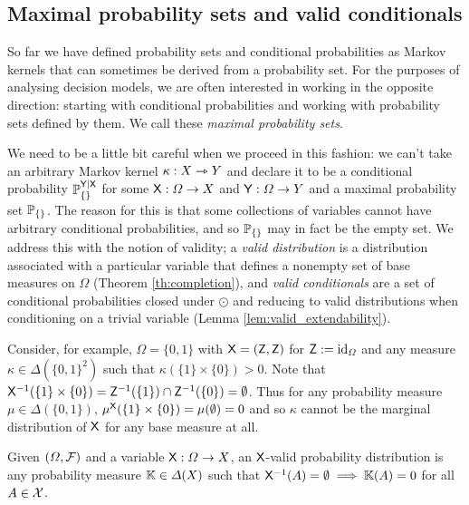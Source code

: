 
\subsection{Maximal probability sets and valid conditionals}

So far we have defined probability sets and conditional probabilities as Markov kernels that can sometimes be derived from a probability set. For the purposes of analysing decision models, we are often interested in working in the opposite direction: starting with conditional probabilities and working with probability sets defined by them. We call these \emph{maximal probability sets}.

We need to be a little bit careful when we proceed in this fashion: we can't take an arbitrary Markov kernel $\kappa:X\rightarrowtriangle Y$ and declare it to be a conditional probability $\mathbb{P}_{\{\}}^{\mathsf{Y}|\mathsf{X}}$ for some $\mathsf{X}:\Omega\to X$ and $\mathsf{Y}:\Omega\to Y$ and a maximal probability set $\mathbb{P}_{\{\}}$. The reason for this is that some collections of variables cannot have arbitrary conditional probabilities, and so $\mathbb{P}_{\{\}}$ may in fact be the empty set. We address this with the notion of validity; a \emph{valid distribution} is a distribution associated with a particular variable that defines a nonempty set of base measures on $\Omega$ (Theorem \ref{th:completion}), and \emph{valid conditionals} are a set of conditional probabilities closed under $\odot$ and reducing to valid distributions when conditioning on a trivial variable (Lemma \ref{lem:valid_extendability}).

Consider, for example, $\Omega=\{0,1\}$ with $\mathsf{X}=(\mathsf{Z},\mathsf{Z})$ for $\mathsf{Z}:=\text{id}_{\Omega}$ and any measure $\kappa\in \Delta(\{0,1\}^2)$ such that $\kappa(\{1\}\times \{0\})>0$. Note that $\mathsf{X}^{-1}(\{1\}\times \{0\})=\mathsf{Z}^{-1}(\{1\})\cap \mathsf{Z}^{-1}(\{0\})=\emptyset$. Thus for any probability measure $\mu\in \Delta(\{0,1\})$, $\mu^{\mathsf{X}}(\{1\}\times \{0\}) = \mu(\emptyset)=0 $ and so $\kappa$ cannot be the marginal distribution of $\mathsf{X}$ for any base measure at all. 

\begin{definition}\label{def:valid_dist}
Given $(\Omega,\mathcal{F})$ and a variable $\mathsf{X}:\Omega\to X$, an $\mathsf{X}$-valid probability distribution is any probability measure $\mathbb{K}\in \Delta(X)$ such that $\mathsf{X}^{-1}(A)=\emptyset\implies \mathbb{K}(A) = 0$ for all $A\in\mathcal{X}$.
\end{definition}

